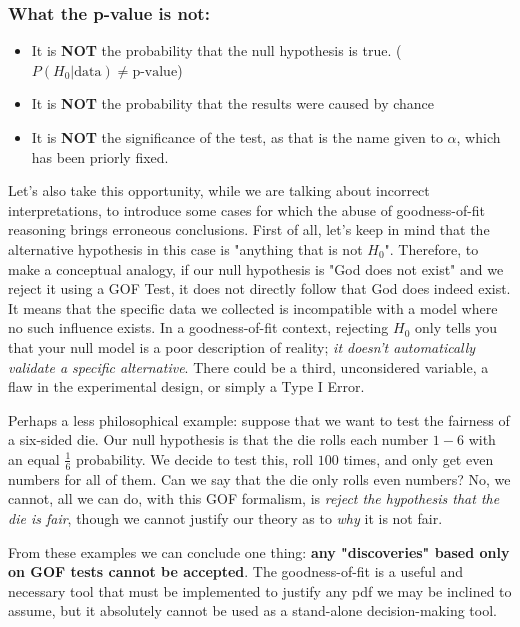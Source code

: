 \subsubsection{What the p-value is not:}
\begin{itemize}
	\item It is \textbf{NOT} the probability that the null hypothesis is true. ($P(H_0 | \text{data}) \neq \text{p-value}$)
	\item It is \textbf{NOT} the probability that the results were caused by chance
	\item It is \textbf{NOT} the significance of the test, as that is the name given to $\alpha$, which has been priorly fixed.  
\end{itemize}

Let's also take this opportunity, while we are talking about incorrect interpretations, to introduce some cases for which the abuse of goodness-of-fit reasoning brings erroneous conclusions. First of all, let's keep in mind that the alternative hypothesis in this case is "anything that is not $H_0$". Therefore, to make a conceptual analogy, if our null hypothesis is "God does not exist" and we reject it using a GOF Test, it does not directly follow that God does indeed exist. It means that the specific data we collected is incompatible with a model where no such influence exists. In a goodness-of-fit context, rejecting $H_0$ only tells you that your null model is a poor description of reality; \emph{it doesn’t automatically validate a specific alternative}. There could be a third, unconsidered variable, a flaw in the experimental design, or simply a Type I Error. 

\begin{example}
	Perhaps a less philosophical example: suppose that we want to test the fairness of a six-sided die. Our null hypothesis is that the die rolls each number $1-6$ with an equal $\frac{1}{6}$ probability. We decide to test this, roll $100$ times, and only get even numbers for all of them. Can we say that the die only rolls even numbers? No, we cannot, all we can do, with this GOF formalism, is \emph{reject the hypothesis that the die is fair}, though we cannot justify our theory as to \emph{why} it is not fair.
\end{example}

From these examples we can conclude one thing: \textbf{any "discoveries" based only on GOF tests cannot be accepted}. The goodness-of-fit is a useful and necessary tool that must be implemented to justify any pdf we may be inclined to assume, but it absolutely cannot be used as a stand-alone decision-making tool. 

